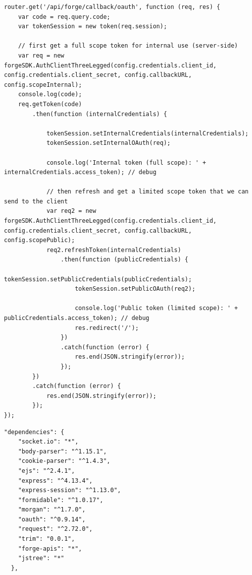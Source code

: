 \documentclass[10pt,draftclsnofoot,onecolumn]{IEEEtran}
\begin{document}
\medskip
\begin{lstlisting}[caption=Exchanging Authorization Code for Token function]
router.get('/api/forge/callback/oauth', function (req, res) {
    var code = req.query.code;
    var tokenSession = new token(req.session);

    // first get a full scope token for internal use (server-side)
    var req = new forgeSDK.AuthClientThreeLegged(config.credentials.client_id, config.credentials.client_secret, config.callbackURL, config.scopeInternal);
    console.log(code);
    req.getToken(code)
        .then(function (internalCredentials) {

            tokenSession.setInternalCredentials(internalCredentials);
            tokenSession.setInternalOAuth(req);

            console.log('Internal token (full scope): ' + internalCredentials.access_token); // debug

            // then refresh and get a limited scope token that we can send to the client
            var req2 = new forgeSDK.AuthClientThreeLegged(config.credentials.client_id, config.credentials.client_secret, config.callbackURL, config.scopePublic);
            req2.refreshToken(internalCredentials)
                .then(function (publicCredentials) {
                    tokenSession.setPublicCredentials(publicCredentials);
                    tokenSession.setPublicOAuth(req2);

                    console.log('Public token (limited scope): ' + publicCredentials.access_token); // debug
                    res.redirect('/');
                })
                .catch(function (error) {
                    res.end(JSON.stringify(error));
                });
        })
        .catch(function (error) {
            res.end(JSON.stringify(error));
        });
});
\end{lstlisting}
\begin{lstlisting}[caption=Package depedencies]
  "dependencies": {
    "socket.io": "*",
    "body-parser": "^1.15.1",
    "cookie-parser": "^1.4.3",
    "ejs": "^2.4.1",
    "express": "^4.13.4",
    "express-session": "^1.13.0",
    "formidable": "^1.0.17",
    "morgan": "^1.7.0",
    "oauth": "^0.9.14",
    "request": "^2.72.0",
    "trim": "0.0.1",
    "forge-apis": "*",
    "jstree": "*"
  },
\end{lstlisting}
\end{document}

